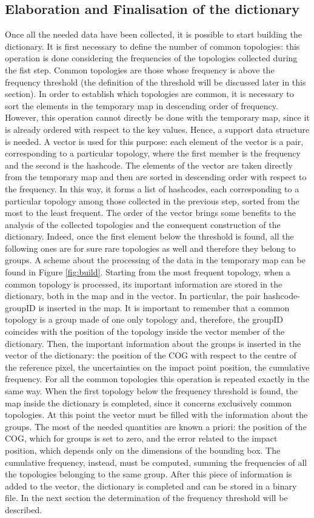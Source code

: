 \subsection{Elaboration and Finalisation of the dictionary}
Once all the needed data have been collected, it is possible to start building the dictionary. It is first necessary to define the number of common topologies: this operation is done considering the frequencies of the topologies collected during the fist step. Common topologies are those whose frequency is above the frequency threshold (the definition of the threshold will be discussed later in this section). In order to establish which topologies are common, it is necessary to sort the elements in the temporary map in descending order of frequency. However, this operation cannot directly be done with the temporary map, since it is already ordered with respect to the key values. Hence, a support data structure is needed. A vector is used for this purpose: each element of the vector is a pair, corresponding to a particular topology, where the first member is the frequency and the second is the hashcode. The elements of the vector are taken directly from the temporary map and then are sorted in descending order with respect to the frequency. In this way, it forms a list of hashcodes, each corresponding to a particular topology among those collected in the previous step, sorted from the most to the least frequent. The order of the vector brings some benefits to the analysis of the collected topologies and the consequent construction of the dictionary. Indeed, once the first element below the threshold is found, all the following ones are for sure rare topologies as well and therefore they belong to groups. A scheme about the processing of the data in the temporary map can be found in Figure \ref{fig:build}.
Starting from the most frequent topology, when a common topology is processed, its important information are stored in the dictionary, both in the map and in the vector. In particular, the pair hashcode-groupID is inserted in the map. It is important to remember that a common topology is a group made of one only topology and, therefore, the groupID coincides with the position of the topology inside the vector member of the dictionary. Then, the important information about the groups is inserted in the vector of the dictionary: the position of the COG with respect to the centre of the reference pixel, the uncertainties on the impact point position, the cumulative frequency. For all the common topologies this operation is repeated exactly in the same way. When the first topology below the frequency threshold is found, the map inside the dictionary is completed, since it concerns exclusively common topologies. At this point the vector must be filled with the information about the groups. The most of the needed quantities are known a priori: the position of the COG, which for groups is set to zero, and the error related to the impact position, which depends only on the dimensions of the bounding box. The cumulative frequency, instead, must be computed, summing the frequencies of all the topologies belonging to the same group. After this piece of information is added to the vector, the dictionary is completed and can be stored in a binary file. In the next section the determination of the frequency threshold will be described.
